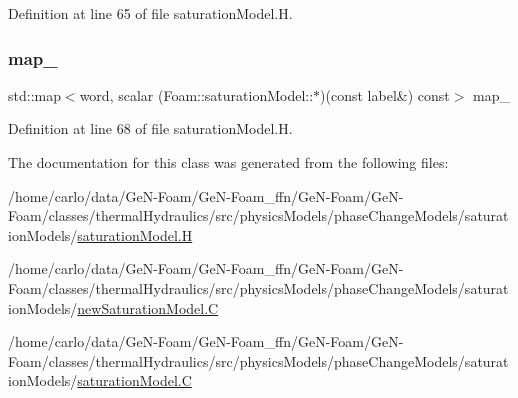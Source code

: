 Definition at line 65 of file saturation\+Model.\+H.

\mbox{\label{classFoam_1_1saturationModel_a9bd85ba5786a73880ae096c2733fa366}} 
\subsubsection{\texorpdfstring{map\+\_\+}{map\_}}
{\footnotesize\ttfamily std\+::map$<$word, scalar (Foam\+::saturation\+Model\+::$\ast$)(const label\&) const$>$ map\+\_\+\hspace{0.3cm}{\ttfamily [protected]}}



Definition at line 68 of file saturation\+Model.\+H.



The documentation for this class was generated from the following files\+:\begin{DoxyCompactItemize}
\item 
/home/carlo/data/\+Ge\+N-\/\+Foam/\+Ge\+N-\/\+Foam\+\_\+ffn/\+Ge\+N-\/\+Foam/\+Ge\+N-\/\+Foam/classes/thermal\+Hydraulics/src/physics\+Models/phase\+Change\+Models/saturation\+Models/\hyperlink{saturationModel_8H}{saturation\+Model.\+H}\item 
/home/carlo/data/\+Ge\+N-\/\+Foam/\+Ge\+N-\/\+Foam\+\_\+ffn/\+Ge\+N-\/\+Foam/\+Ge\+N-\/\+Foam/classes/thermal\+Hydraulics/src/physics\+Models/phase\+Change\+Models/saturation\+Models/\hyperlink{newSaturationModel_8C}{new\+Saturation\+Model.\+C}\item 
/home/carlo/data/\+Ge\+N-\/\+Foam/\+Ge\+N-\/\+Foam\+\_\+ffn/\+Ge\+N-\/\+Foam/\+Ge\+N-\/\+Foam/classes/thermal\+Hydraulics/src/physics\+Models/phase\+Change\+Models/saturation\+Models/\hyperlink{saturationModel_8C}{saturation\+Model.\+C}\end{DoxyCompactItemize}
